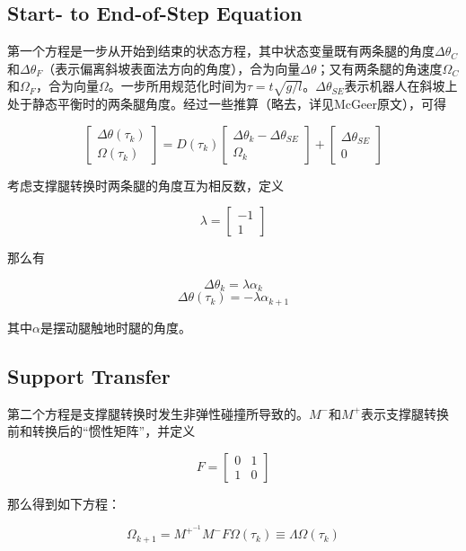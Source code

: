 \documentclass[UTF8]{ctexart}
\begin{document}
\subsection{Start- to End-of-Step Equation}
第一个方程是一步从开始到结束的状态方程，其中状态变量既有两条腿的角度$\Delta\theta_{C}$和$\Delta\theta_{F}$（表示偏离斜坡表面法方向的角度），合为向量$\Delta\theta$；又有两条腿的角速度$\Omega_{C}$和$\Omega_{F}$，合为向量$\Omega$。一步所用规范化时间为$\tau=t\sqrt{g/l}$。$\Delta\theta_{SE}$表示机器人在斜坡上处于静态平衡时的两条腿角度。经过一些推算（略去，详见McGeer原文），可得\par
\begin{equation}
\left[
\begin{array}{c}
\Delta\theta(\tau_{k})\\
\Omega(\tau_{k})
\end{array}
\right]
=D(\tau_{k})
\left[
\begin{array}{c}
\Delta\theta_{k}-\Delta\theta_{SE}\\
\Omega_{k}
\end{array}
\right]
+
\left[
\begin{array}{c}
\Delta\theta_{SE}\\
0
\end{array}
\right]
\end{equation}
\par
考虑支撑腿转换时两条腿的角度互为相反数，定义\par
\begin{equation}
\lambda=
\left[
\begin{array}{c}
-1\\
1
\end{array}
\right]
\end{equation}
\par
那么有\par
\begin{equation}
\Delta\theta_{k}=\lambda\alpha_{k}
\end{equation}
\begin{equation}
\Delta\theta(\tau_{k})=-\lambda\alpha_{k+1}
\end{equation}
\par
其中$\alpha$是摆动腿触地时腿的角度。
\subsection{Support Transfer}
第二个方程是支撑腿转换时发生非弹性碰撞所导致的。$M^{-}$和$M^{+}$表示支撑腿转换前和转换后的“惯性矩阵”，并定义\par
\begin{equation}
F=
\left[
\begin{array}{cc}
0 & 1 \\
1 & 0
\end{array}
\right]
\end{equation}
\par
那么得到如下方程：\par
\begin{equation}
\Omega_{k+1}=M^{+}^{-1}M^{-}F\Omega(\tau_{k})\equiv\Lambda\Omega(\tau_{k})
\end{equation}
\end{document}
